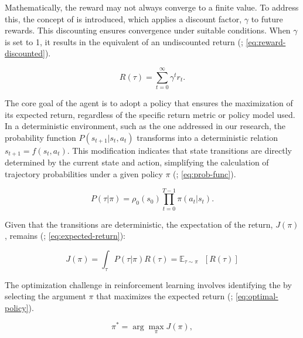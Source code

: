 \noindent  Mathematically, the reward may not always converge to a finite value. To address this, the concept of  is introduced, which applies a discount factor, $\gamma$ to future rewards. This discounting ensures convergence under suitable conditions. When $\gamma$ is set to 1, it results in the equivalent of an undiscounted return (\textcolor{deepblue}{\cite{Sutton1998}; \autoref{eq:reward-discounted}}).

\begin{equation}
    R(\tau) = \sum_{t=0}^{\infty} \gamma^{t}r_t.
    \label{eq:reward-discounted}
\end{equation}

\noindent The core goal of the agent is to adopt a policy that ensures the maximization of its expected return, regardless of the specific return metric or policy model used. In a deterministic environment, such as the one addressed in our research, the probability function $P(s_{t+1} | s_t, a_t)$ transforms into a deterministic relation $s_{t+1} = f(s_t, a_t)$. This modification indicates that state transitions are directly determined by the current state and action, simplifying the calculation of trajectory probabilities under a given policy $\pi$ (\textcolor{deepblue}{\cite{Sutton1998}; \autoref{eq:prob-func}}).

\begin{equation}
    P(\tau | \pi) = \rho_0(s_0)\prod_{t=0}^{T-1} \pi(a_t|s_t).
    \label{eq:prob-func}
\end{equation}

\noindent Given that the transitions are deterministic, the expectation of the return, $J(\pi)$, remains (\textcolor{deepblue}{\cite{Sutton1998}; \autoref{eq:expected-return}}):

\begin{equation}
    J(\pi) = \int_{\tau} P(\tau | \pi) R(\tau) = \mathbb{E}_{\tau \sim \pi} \text{ }[R(\tau)]
    \label{eq:expected-return}
\end{equation}

\noindent The optimization challenge in reinforcement learning involves identifying the  by selecting the argument $\pi$ that maximizes the expected return (\textcolor{deepblue}{\cite{Sutton1998}; \autoref{eq:optimal-policy}}).

\begin{equation}
    \pi^* = \arg \max_{\pi} J(\pi),
    \label{eq:optimal-policy}
\end{equation}

